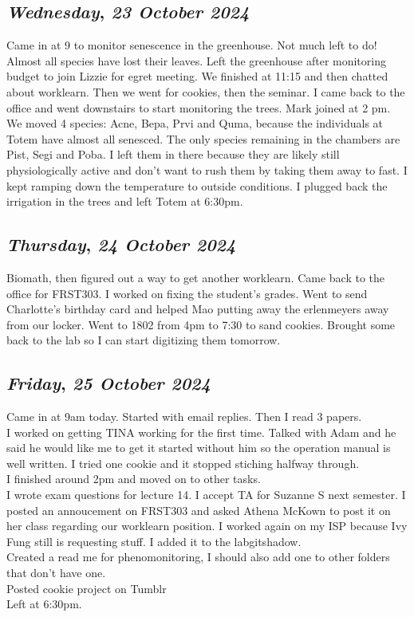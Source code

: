 \def\day{\textit{23 October 2024}}
\def\weekday{\textit{Wednesday}}
\subsection*{\weekday, \day}
Came in at 9 to monitor senescence in the greenhouse. Not much left to do! Almost all species have lost their leaves. Left the greenhouse after monitoring budget to join Lizzie for egret meeting. We finished at 11:15 and then chatted about worklearn. Then we went for cookies, then the seminar. I came back to the office and went downstairs to start monitoring the trees. Mark joined at 2 pm. We moved 4 species: Acne, Bepa, Prvi and Quma, because the individuals at Totem have almost all senesced. The only species remaining in the chambers are Pist, Segi and Poba. I left them in there because they are likely still physiologically active and don't want to rush them by taking them away to fast. I kept ramping down the temperature to outside conditions. I plugged back the irrigation in the trees and left Totem at 6:30pm. 

\def\day{\textit{24 October 2024}}
\def\weekday{\textit{Thursday}}
\subsection*{\weekday, \day}
Biomath, then figured out a way to get another worklearn. Came back to the office for FRST303. I worked on fixing the student's grades. Went to send Charlotte's birthday card and helped Mao putting away the erlenmeyers away from our locker. Went to 1802 from 4pm to 7:30 to sand cookies. Brought some back to the lab so I can start digitizing them tomorrow. 

\def\day{\textit{25 October 2024}}
\def\weekday{\textit{Friday}}
\subsection*{\weekday, \day}
Came in at 9am today. Started with email replies. Then I read 3 papers.\\
I worked on getting TINA working for the first time. Talked with Adam and he said he would like me to get it started without him so the operation manual is well written. I tried one cookie and it stopped stiching halfway through. \\
I finished around 2pm and moved on to other tasks. \\
I wrote exam questions for lecture 14. I accept TA for Suzanne S next semester. I posted an annoucement on FRST303 and asked Athena McKown to post it on her class regarding our worklearn position. I worked again on my ISP because Ivy Fung still is requesting stuff. I added it to the labgitshadow. \\
Created a read me for phenomonitoring, I should also add one to other folders that don't have one. \\
Posted cookie project on Tumblr\\
Left at 6:30pm.

